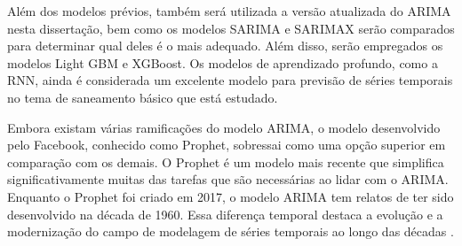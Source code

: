 Além dos modelos prévios, também será utilizada a versão atualizada do ARIMA nesta dissertação, bem como os modelos SARIMA e SARIMAX serão comparados para determinar qual deles é o mais adequado. Além disso, serão empregados os modelos Light GBM e XGBoost. Os modelos de aprendizado profundo, como a RNN, ainda é considerada um excelente modelo para previsão de séries temporais no tema de saneamento básico que está estudado.

Embora existam várias ramificações do modelo ARIMA, o modelo desenvolvido pelo Facebook, conhecido como Prophet, sobressai como uma opção superior em comparação com os demais. O Prophet é um modelo mais recente que simplifica significativamente muitas das tarefas que são necessárias ao lidar com o ARIMA. Enquanto o Prophet foi criado em 2017, o modelo ARIMA tem relatos de ter sido desenvolvido na década de 1960. Essa diferença temporal destaca a evolução e a modernização do campo de modelagem de séries temporais ao longo das décadas \cite{ramos2010previsoes}.











